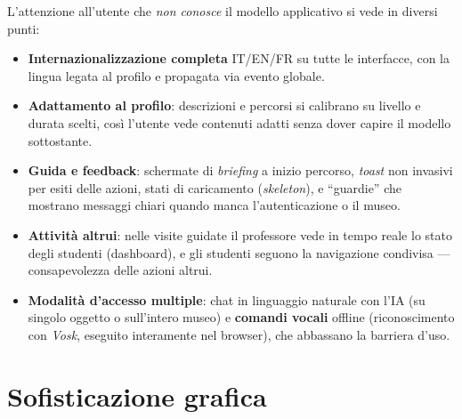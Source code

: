 \documentclass[11pt,a4paper]{article}
\begin{document}
L'attenzione all'utente che \emph{non conosce} il modello applicativo si vede in
diversi punti:
\begin{itemize}[leftmargin=1.3em]
  \item \textbf{Internazionalizzazione completa} IT/EN/FR su tutte le interfacce,
    con la lingua legata al profilo e propagata via evento globale.
  \item \textbf{Adattamento al profilo}: descrizioni e percorsi si calibrano su
    livello e durata scelti, così l'utente vede contenuti adatti senza dover
    capire il modello sottostante.
  \item \textbf{Guida e feedback}: schermate di \emph{briefing} a inizio percorso,
    \emph{toast} non invasivi per esiti delle azioni, stati di caricamento
    (\emph{skeleton}), e ``guardie'' che mostrano messaggi chiari quando manca
    l'autenticazione o il museo.
  \item \textbf{Attività altrui}: nelle visite guidate il professore vede in
    tempo reale lo stato degli studenti (dashboard), e gli studenti seguono la
    navigazione condivisa --- consapevolezza delle azioni altrui.
  \item \textbf{Modalità d'accesso multiple}: chat in linguaggio naturale con
    l'IA (su singolo oggetto o sull'intero museo) e \textbf{comandi vocali}
    offline (riconoscimento con \emph{Vosk}, eseguito interamente nel browser),
    che abbassano la barriera d'uso.
\end{itemize}

\section{Sofisticazione grafica}
\end{document}
